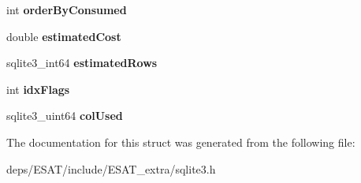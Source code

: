 \begin{DoxyCompactItemize}
\mbox{\label{structsqlite3__index__info_a5515d9de0f37f68d7e0930c20a668b29}} 
int {\bfseries order\+By\+Consumed}
\item 
\mbox{\label{structsqlite3__index__info_aa8b4fe1d2ee38aab57ba5e1da00d7830}} 
double {\bfseries estimated\+Cost}
\item 
\mbox{\label{structsqlite3__index__info_adcdf25dcf9848a6fedf539bb9c921b7f}} 
sqlite3\+\_\+int64 {\bfseries estimated\+Rows}
\item 
\mbox{\label{structsqlite3__index__info_a8acf2a7efbc3e193cf01d2afbd44fdbb}} 
int {\bfseries idx\+Flags}
\item 
\mbox{\label{structsqlite3__index__info_a99787169e2f78c0728bdb339c4107a2e}} 
sqlite3\+\_\+uint64 {\bfseries col\+Used}
\end{DoxyCompactItemize}


The documentation for this struct was generated from the following file\+:\begin{DoxyCompactItemize}
\item 
deps/\+E\+S\+A\+T/include/\+E\+S\+A\+T\+\_\+extra/sqlite3.\+h\end{DoxyCompactItemize}

